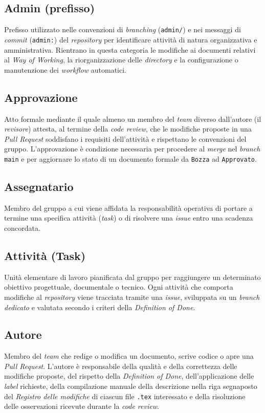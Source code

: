 \documentclass[11pt, a4paper]{article}
\begin{document}
\subsection*{Admin (prefisso)}
Prefisso utilizzato nelle convenzioni di \textit{branching} (\texttt{admin/}) e nei messaggi di \textit{commit} (\texttt{admin:}) del \textit{repository} per identificare attività di natura organizzativa e amministrativa. Rientrano in questa categoria le modifiche ai documenti relativi al \textit{Way of Working}, la riorganizzazione delle \textit{directory} e la configurazione o manutenzione dei \textit{workflow} automatici.

\subsection*{Approvazione}
Atto formale mediante il quale almeno un membro del \textit{team} diverso dall'autore (il \textit{revisore}) attesta, al termine della \textit{code review}, che le modifiche proposte in una \textit{Pull Request} soddisfano i requisiti dell'attività e rispettano le convenzioni del gruppo. L'approvazione è condizione necessaria per procedere al \textit{merge} nel \textit{branch} \texttt{main} e per aggiornare lo stato di un documento formale da \texttt{Bozza} ad \texttt{Approvato}.

\subsection*{Assegnatario}
Membro del gruppo a cui viene affidata la responsabilità operativa di portare a termine una specifica attività (\textit{task}) o di risolvere una \textit{issue} entro una scadenza concordata.

\subsection*{Attività (Task)}
Unità elementare di lavoro pianificata dal gruppo per raggiungere un determinato obiettivo progettuale, documentale o tecnico. Ogni attività che comporta modifiche al \textit{repository} viene tracciata tramite una \textit{issue}, sviluppata su un \textit{branch dedicato} e valutata secondo i criteri della \textit{Definition of Done}.

\subsection*{Autore}
Membro del \textit{team} che redige o modifica un documento, scrive codice o apre una \textit{Pull Request}. L'autore è responsabile della qualità e della correttezza delle modifiche proposte, del rispetto della \textit{Definition of Done}, dell'applicazione delle \textit{label} richieste, della compilazione manuale della descrizione nella riga segnaposto del \textit{Registro delle modifiche} di ciascun file \texttt{.tex} interessato e della risoluzione delle osservazioni ricevute durante la \textit{code review}.
\end{document}
